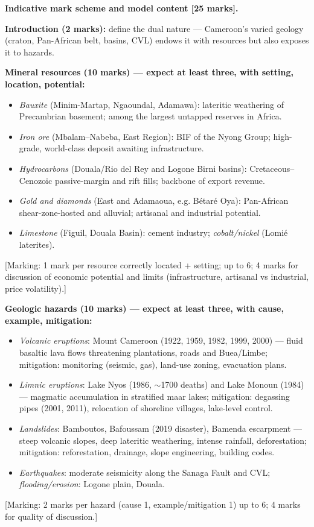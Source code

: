 \documentclass[11pt]{article}
\begin{document}
\begin{corrige}
\textbf{Indicative mark scheme and model content [25 marks].}

\textbf{Introduction (2 marks):} define the dual nature — Cameroon's varied geology (craton, Pan-African belt, basins, CVL) endows it with resources but also exposes it to hazards.

\textbf{Mineral resources (10 marks) — expect at least three, with setting, location, potential:}
\begin{itemize}
\item \emph{Bauxite} (Minim-Martap, Ngaoundal, Adamawa): lateritic weathering of Precambrian basement; among the largest untapped reserves in Africa.
\item \emph{Iron ore} (Mbalam–Nabeba, East Region): BIF of the Nyong Group; high-grade, world-class deposit awaiting infrastructure.
\item \emph{Hydrocarbons} (Douala/Rio del Rey and Logone Birni basins): Cretaceous–Cenozoic passive-margin and rift fills; backbone of export revenue.
\item \emph{Gold and diamonds} (East and Adamaoua, e.g. Bétaré Oya): Pan-African shear-zone-hosted and alluvial; artisanal and industrial potential.
\item \emph{Limestone} (Figuil, Douala Basin): cement industry; \emph{cobalt/nickel} (Lomié laterites).
\end{itemize}
[Marking: 1 mark per resource correctly located + setting; up to 6; 4 marks for discussion of economic potential and limits (infrastructure, artisanal vs industrial, price volatility).]

\textbf{Geologic hazards (10 marks) — expect at least three, with cause, example, mitigation:}
\begin{itemize}
\item \emph{Volcanic eruptions}: Mount Cameroon (1922, 1959, 1982, 1999, 2000) — fluid basaltic lava flows threatening plantations, roads and Buea/Limbe; mitigation: monitoring (seismic, gas), land-use zoning, evacuation plans.
\item \emph{Limnic eruptions}: Lake Nyos (1986, $\sim$1700 deaths) and Lake Monoun (1984) — magmatic  accumulation in stratified maar lakes; mitigation: degassing pipes (2001, 2011), relocation of shoreline villages, lake-level control.
\item \emph{Landslides}: Bamboutos, Bafoussam (2019 disaster), Bamenda escarpment — steep volcanic slopes, deep lateritic weathering, intense rainfall, deforestation; mitigation: reforestation, drainage, slope engineering, building codes.
\item \emph{Earthquakes}: moderate seismicity along the Sanaga Fault and CVL; \emph{flooding/erosion}: Logone plain, Douala.
\end{itemize}
[Marking: 2 marks per hazard (cause 1, example/mitigation 1) up to 6; 4 marks for quality of discussion.]


\end{corrige}
\end{document}

